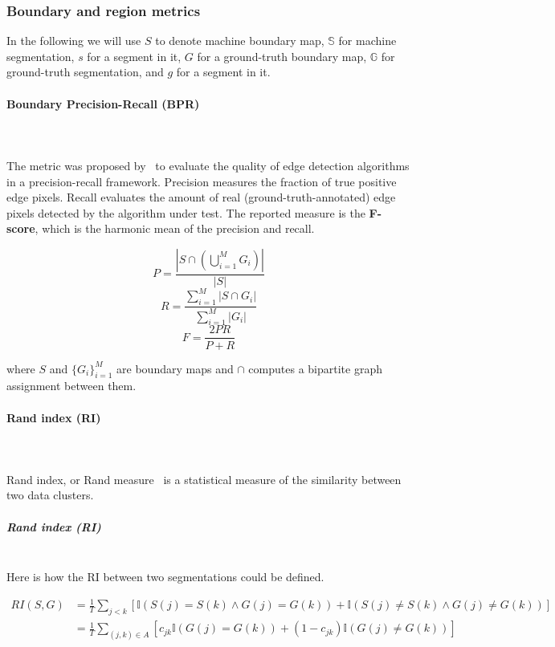 \subsubsection{Boundary and region metrics}
\label{sec:ch4-boundary-and-region-metrics-maths}
In the following we will use $S$ to denote machine boundary map, $\mathbb{S}$ for machine segmentation, $s$ for a segment in it, $G$ for a ground-truth boundary map, $\mathbb{G}$ for ground-truth segmentation, and $g$ for a segment in it.

\paragraph{Boundary Precision-Recall (BPR)}\mbox{}\\\mbox{}\\
The metric was proposed by~\cite{Arbelaez11} to evaluate the quality of edge detection algorithms in a precision-recall framework. Precision measures the fraction of true positive edge pixels. Recall evaluates the amount of real (\eg ground-truth-annotated) edge pixels detected by the algorithm under test. The reported measure is the \textbf{F-score}, which is the harmonic mean of the precision and recall.

\label{sec:ch4-BPR-maths}
\[
P=\frac{\left|S\cap\left(\bigcup\limits _{i=1}^{M}G_{i}\right)\right|}{|S|}
\]
\[
R=\frac{{\sum\limits _{i=1}^{M}\left|S\cap G_{i}\right|}}{\sum\limits _{i=1}^{M}\left|G_{i}\right|}
\]
\[
F=\frac{2PR}{P+R}
\]

where $S$ and $\{G_{i}\}_{i=1}^{M}$ are boundary maps and $\cap$
computes a bipartite graph assignment between them.

\paragraph{Rand index (RI)}\mbox{}\\\mbox{}\\
Rand index, or Rand measure~\cite{rand1971objective} is a statistical measure of the similarity between two data clusters.

\subparagraph*{Rand index (RI)}\mbox{}\\
Here is how the RI between two segmentations could be defined.

\begin{align*}
RI(S,G) & =\frac{1}{T}\sum\limits _{j<k}\left[\mathbb{I}\left(S(j)=S(k)\wedge G(j)=G(k)\right)+\mathbb{I}\left(S(j)\neq S(k)\wedge G(j)\neq G(k)\right)\right]\\
 & =\frac{1}{T}\sum\limits _{(j,k)\in A}\left[c_{jk}\mathbb{I}\left(G(j)=G(k)\right)+(1-c_{jk})\mathbb{I}\left(G(j)\neq G(k)\right)\right]
\end{align*}

